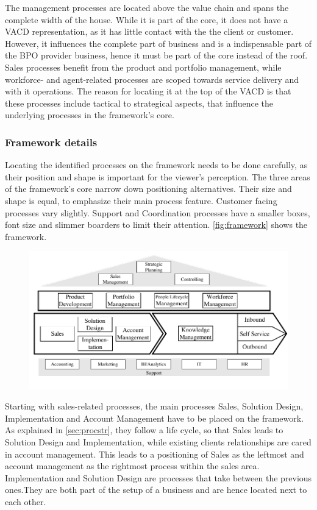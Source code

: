 	The management processes are located above the value chain and spans the complete width of the house. While it is part of the core, it does not have a \acrshort{VACD} representation, as it has little contact with the the client or customer. However, it influences the complete part of business and is a indispensable part of the \acrshort{BPO} provider business, hence it must be part of the core instead of the roof. Sales processes benefit from the product and portfolio management, while workforce- and agent-related processes are scoped towards service delivery and with it operations. The reason for locating it at the top of the \acrshort{VACD} is that these processes include tactical to strategical aspects, that influence the underlying processes in the framework's core. 
	
	\subsubsection{Framework details}
	
	Locating the identified processes on the framework needs to be done carefully, as their position and shape is important for the viewer's perception. The three areas of the framework's core narrow down positioning alternatives. Their size and shape is equal, to emphasize their main process feature. Customer facing processes vary slightly. Support and Coordination processes have a smaller boxes, font size and slimmer boarders to limit their attention. \Fig \ref{fig:framework} shows the framework.
	
		\begin{figure}[caption={Framework}, label={fig:framework}]
		{	\includegraphics[width=.8\textwidth]{figures/framework.pdf}}
	\end{figure} 
	
	
	 Starting with sales-related processes, the main processes Sales, Solution Design, Implementation and Account Management have to be placed on the framework. As explained in \ref{sec:procstr}, they follow a life cycle, so that Sales leads to Solution Design and Implementation, while existing clients relationships are cared in account management. This leads to a positioning of Sales as the leftmost and account management as the rightmost process within the sales area. Implementation and Solution Design are processes that take between the previous ones.They are both part of the setup of a business and are hence located next to each other. 
	 
